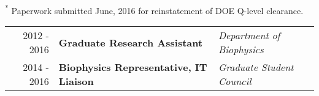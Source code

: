 \begin{minipage}{\textwidth}
	\begin{center}
		\footnotesize \textsuperscript{*} Paperwork submitted June, 2016 for reinstatement of DOE Q-level clearance.
	\end{center}
\end{minipage}


\begin{minipage}{\textwidth}
	\begin{tabular}{r|ll}
		2012 - 2016 & \textbf{Graduate Research Assistant} & \textit{Department of Biophysics}  \\
		2014 - 2016 & \textbf{Biophysics Representative, IT Liaison} & \textit{Graduate Student Council}  \\
	\end{tabular}
\end{minipage}

